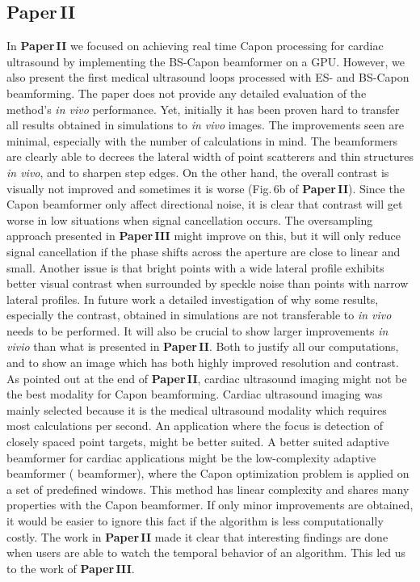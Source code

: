 \subsection{Paper\,II}
In \textbf{Paper\,II} we focused on achieving real time Capon processing for cardiac ultrasound by implementing the BS-Capon beamformer on a GPU. However, we also present the first medical ultrasound loops processed with ES- and BS-Capon beamforming.  The paper does not provide any detailed evaluation of the method's \textit{in vivo} performance. Yet, initially it has been proven hard to transfer all results obtained in simulations to \textit{in vivo} images. The improvements seen are minimal, especially with the number of calculations in mind. The beamformers are clearly able to decrees the lateral width of point scatterers and thin structures \textit{in vivo}, and to sharpen step edges. On the other hand, the overall contrast is visually not improved and sometimes it is worse (Fig.\,6b of \textbf{Paper\,II}). Since the Capon beamformer only affect directional noise, it is clear that contrast will get worse in low  situations when signal cancellation occurs. The oversampling approach presented in \textbf{Paper\,III} might improve on this, but it will only reduce signal cancellation if the phase shifts across the aperture are close to linear and small. Another issue is that bright points with a wide lateral profile exhibits better visual contrast when surrounded by speckle noise than points with narrow lateral profiles. In future work a detailed investigation of why some results, especially the contrast, obtained in simulations are not transferable to \textit{in vivo} needs to be performed. It will also be crucial to show larger improvements \textit{in vivio} than what is presented in \textbf{Paper\,II}. Both to justify all our computations, and to show an image which has both highly improved resolution and contrast. As pointed out at the end of \textbf{Paper\,II}, cardiac ultrasound imaging might not be the best modality for Capon beamforming. Cardiac ultrasound imaging was mainly selected because it is the medical ultrasound modality which requires most calculations per second. An application where the focus is detection of closely spaced point targets, might be better suited. A better suited adaptive beamformer for cardiac applications might be the low-complexity adaptive beamformer ( beamformer), where the Capon optimization problem is applied on a set of predefined windows. This method has linear complexity and shares many properties with the Capon beamformer. If only minor improvements are obtained, it would be easier to ignore this fact if the algorithm is less computationally costly. %
The work in \textbf{Paper\,II} made it clear that interesting findings are done when users are able to watch the temporal behavior of an algorithm. This led us to the work of \textbf{Paper\,III}. 


